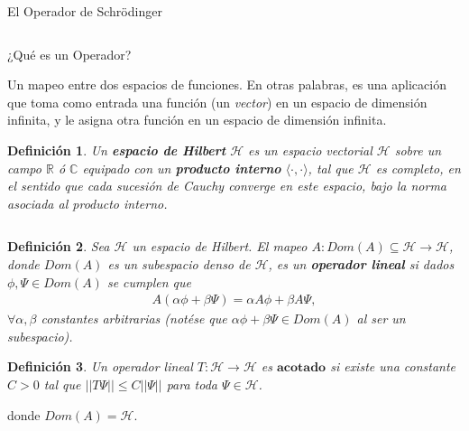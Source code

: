 \documentclass[aspectratio=1610]{beamer}
\newcommand*{\field}[1]{\mathbb{#1}}
\newtheorem*{defn}{Definición}
\begin{document}
\begin{frame}
\begin{columns}
\column{37em}
\vspace{1cm}
\Huge{\centerline{El Operador de Schrödinger}}
\end{columns}
\end{frame}

\begin{frame}{¿Qué es un Operador?}

Un mapeo entre dos espacios de funciones. En otras palabras, es una aplicación que toma como entrada una función (un \textit{vector}) en un espacio de dimensión infinita, y le asigna otra función en un espacio de dimensión infinita.

\vspace{0.1\textheight}

\begin{defn}
    Un \textbf{espacio de Hilbert} $\mathcal{H}$ es un espacio vectorial $\mathcal{H}$ sobre un campo $\field{R}$ ó $\field{C}$ equipado con un \textbf{producto interno} $\langle\cdot,\cdot \rangle$, tal que $\mathcal{H}$ es completo, en el sentido que cada sucesión de Cauchy converge en este espacio, bajo la norma asociada al producto interno.
\end{defn}
   
\begin{columns}
\column{37em}
\end{columns}
\end{frame}


\begin{frame}{}

\begin{defn}
    Sea $\mathcal{H}$ un espacio de Hilbert. El mapeo $A:Dom(A)\subseteq\mathcal{H}\longrightarrow\mathcal{H}$, donde $Dom(A)$ es un subespacio denso de $\mathcal{H}$, es un \textbf{operador lineal} si dados $\phi,\Psi \in Dom(A)$ se cumplen que
    \begin{align*}
        A(\alpha\phi + \beta\Psi) = \alpha A\phi + \beta A \Psi,
    \end{align*}
    $\forall \alpha, \beta$ constantes arbitrarias (notése que $\alpha\phi + \beta\Psi \in Dom(A)$ al ser un subespacio).
\end{defn}

\begin{defn}
    Un operador lineal\: $T:\mathcal{H} \longrightarrow \mathcal{H}$ es $\textbf{acotado}$ si existe una constante $C > 0$ tal que $||T\Psi|| \leq C||\Psi||$ para toda $\Psi \in \mathcal{H}$.
    \label{def:opeAcot}
\end{defn}
donde $Dom(A) = \mathcal{H}$.
   
\begin{columns}
\column{37em}
\end{columns}
\end{frame}
\end{document}
